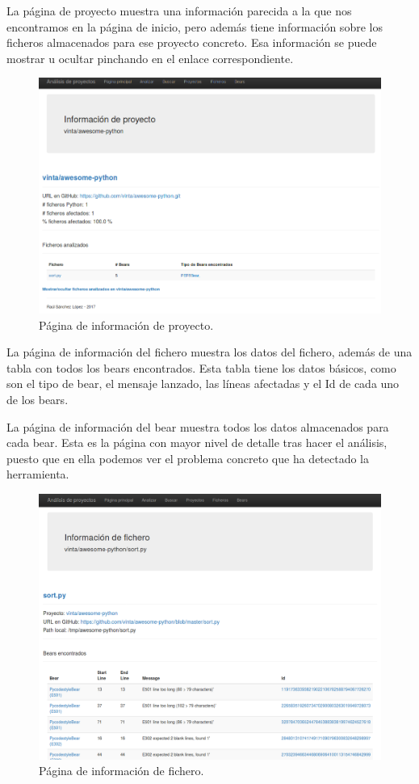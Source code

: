 \documentclass[a4paper, 12pt]{book}
\begin{document}
La página de proyecto muestra una información parecida a la que nos encontramos en la página de inicio, pero además tiene información sobre los ficheros almacenados para ese proyecto concreto. Esa información se puede mostrar u ocultar pinchando en el enlace correspondiente.
\begin{figure}[H]
  \centering
  \includegraphics[width=12cm, keepaspectratio]{img/infoProyecto}
  \caption{Página de información de proyecto.}
  \label{fig:infoProyecto}
\end{figure}

La página de información del fichero muestra los datos del fichero, además de una tabla con todos los bears encontrados. Esta tabla tiene los datos básicos, como son el tipo de bear, el mensaje lanzado, las líneas afectadas y el Id de cada uno de los bears.

La página de información del bear muestra todos los datos almacenados para cada bear. Esta es la página con mayor nivel de detalle tras hacer el análisis, puesto que en ella podemos ver el problema concreto que ha detectado la herramienta.

\begin{figure}[H]
  \centering
  \includegraphics[width=12cm, keepaspectratio]{img/infoFichero}
  \caption{Página de información de fichero.}
  \label{fig:infoFichero}
\end{figure}
\end{document}
